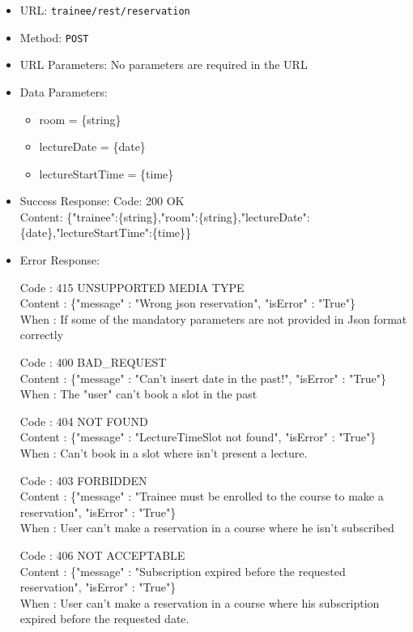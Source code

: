 \begin{itemize}
	
	\item URL: \texttt{trainee/rest/reservation}
	\item Method: \texttt{POST}
	\item URL Parameters: No parameters are required in the URL
	\item Data Parameters: 
	\begin{itemize}
		\item room = \{string\}
		\item lectureDate = \{date\}
		\item lectureStartTime = \{time\}
	\end{itemize}
	\item Success Response:
	Code: 200 OK\\
	Content: \{"trainee":\{string\},"room":\{string\},"lectureDate":\{date\},"lectureStartTime":\{time\}\}
	\item Error Response:
	
	Code : 415 UNSUPPORTED MEDIA TYPE\\
	Content : \{"message" : "Wrong json reservation", "isError" : "True"\}\\
	When : If some of the mandatory parameters are not provided in Json format correctly
	
	Code : 400 BAD\_REQUEST\\
	Content : \{"message" : "Can't insert date in the past!", "isError" : "True"\}\\
	When : The "user" can't book a slot in the past
	
	Code : 404 NOT FOUND\\
	Content : \{"message" : "LectureTimeSlot not found", "isError" : "True"\}\\
	When : Can't book in a slot where isn't present a lecture.
	
	Code : 403 FORBIDDEN\\
	Content : \{"message" : "Trainee must be enrolled to the course to make a reservation", "isError" : "True"\}\\
	When : User can't make a reservation in a course where he isn't subscribed
	
	Code : 406 NOT ACCEPTABLE\\
	Content : \{"message" : "Subscription expired before the requested reservation", "isError" : "True"\}\\
	When : User can't make a reservation in a course where his subscription expired before the requested date.
	

\end{itemize}
